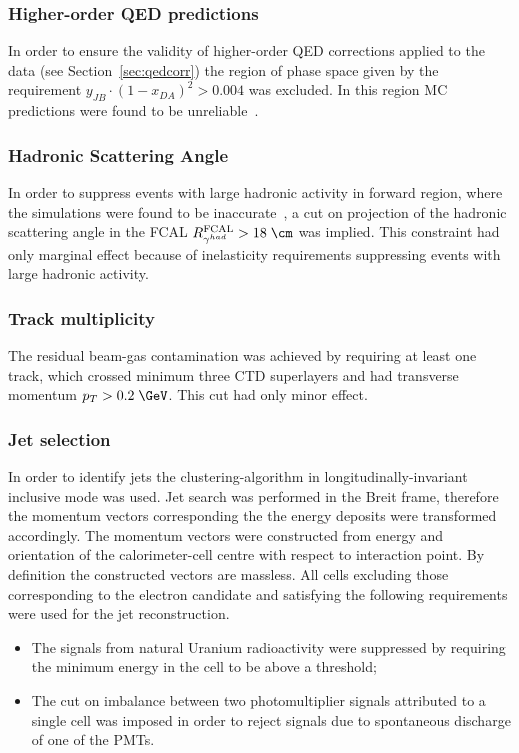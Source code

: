 \subsubsection{Higher-order QED predictions}
\label{subsubsec:qedcorcut}
In order to ensure the validity of higher-order QED corrections applied to the data (see Section~\ref{sec:qedcorr}) the region of phase space given by the requirement $y_{JB}\cdot\left(1-x_{DA}\right)^2>0.004$ was excluded. In this region MC predictions were found to be unreliable~\cite{cpc:81:381}.

\subsubsection{Hadronic Scattering Angle}
\label{subsubsec:gammahadcut}
In order to suppress events with large hadronic activity in forward region, where the simulations were found to be inaccurate~\cite{thesis:jose:2003}, a cut on projection of the hadronic scattering angle in the FCAL $R^\text{FCAL}_{\gamma^{had}} > 18\;\cm$ was implied. This constraint had only marginal effect because of inelasticity requirements suppressing events with large hadronic activity.

\subsubsection{Track multiplicity}
\label{subsubsec:trackmultcut}
The residual beam-gas contamination was achieved by requiring at least one track, which crossed minimum three CTD superlayers and had transverse momentum $p_T>0.2\;\GeV$. This cut had only minor effect.

\subsubsection{Jet selection}
\label{subsubsec:jetselect}
In order to identify jets the \kt clustering-algorithm in longitudinally-invariant inclusive mode was used. Jet search was performed in the Breit frame, therefore the momentum vectors corresponding the the energy deposits were transformed accordingly. The momentum vectors were constructed from energy and orientation of the calorimeter-cell centre with respect to interaction point. By definition the constructed vectors are massless. All cells excluding those corresponding to the electron candidate and satisfying the following requirements were used for the jet reconstruction.
\begin{itemize}
	\item The signals from natural Uranium radioactivity were suppressed by requiring the minimum energy in the cell to be above a threshold;
	\item The cut on imbalance between two photomultiplier signals attributed to a single cell was imposed in order to reject signals due to spontaneous discharge of one of the PMTs.
\end{itemize}

